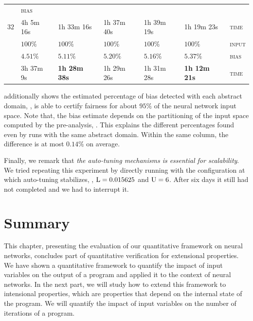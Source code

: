 \begin{table}[t]
{\begin{tabular}{ P{3em}  P{6em}  P{6em}  P{6em}  P{6em} P{6em} P{2.4em} }
    & \textsc{bias} \\
     & 4h 5m 16s & 1h 33m 16s & 1h 37m 40s & 1h 39m 19s & 1h 19m 23s
    & \textsc{time} \\
    \midrule
      & $100\%$ & $100\%$ & $100\%$ & $100\%$ & $100\%$
    & \textsc{input} \\
    & $4.51\%$ & $5.11\%$ & $5.20\%$ & $5.16\%$ & $5.37\%$
    & \textsc{bias} \\
       & 3h 37m 9s & \textbf{1h 28m 38s} & 1h 29m 26s & 1h 31m 28s & \textbf{1h 12m 21s}
    & \textsc{time} \\
    \bottomrule
    \end{tabular}
}
\end{table}

 additionally shows the estimated percentage of bias detected with each abstract domain, \ie, \libra{} is able to certify fairness for about $95\%$ of the neural network input space. Note that, the bias estimate depends on the partitioning of the input space computed by the pre-analysis, \cf{} . This explains the different percentages found even by runs with the same abstract domain. Within the same column, the difference is at most $0.14\%$ on average.

Finally, we remark that \emph{the auto-tuning mechanisms is essential for scalability}. We tried repeating this experiment by directly
running \libra{} with the configuration at which auto-tuning stabilizes, \ie, $\textup{L} = 0.015625$ and $\textup{U} = 6$. After six days it still had not completed and we had to interrupt it.

\section{Summary}

This chapter, presenting the evaluation of our quantitative framework on neural networks, concludes part of quantitative verification for extensional properties.
We have shown a quantitative framework to quantify the impact of input variables on the output of a program and applied it to the context of neural networks.
In the next part, we will study how to extend this framework to intensional properties, which are properties that depend on the internal state of the program.
We will quantify the impact of input variables on the number of iterations of a program.


